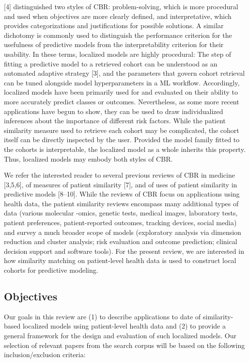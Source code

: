 \documentclass[preprint, 3p,
authoryear]{elsarticle} %
\begin{document}
{[}4{]} distinguished two styles of CBR: problem-solving, which is more
procedural and used when objectives are more clearly defined, and
interpretative, which provides categorizations and justifications for
possible solutions. A similar dichotomy is commonly used to distinguish
the performance criterion for the usefulness of predictive models from
the interpretability criterion for their usability. In these terms,
localized models are highly procedural: The step of fitting a predictive
model to a retrieved cohort can be understood as an automated adaptive
strategy {[}3{]}, and the parameters that govern cohort retrieval can be
tuned alongside model hyperparameters in a ML workflow. Accordingly,
localized models have been primarily used for and evaluated on their
ability to more accurately predict classes or outcomes. Nevertheless, as
some more recent applications have begun to show, they can be used to
draw individualized inferences about the importance of different risk
factors. While the patient similarity measure used to retrieve each
cohort may be complicated, the cohort itself can be directly inspected
by the user. Provided the model family fitted to the cohorts is
interpretable, the localized model as a whole inherits this property.
Thus, localized models may embody both styles of CBR.

We refer the interested reader to several previous reviews of CBR in
medicine {[}3,5,6{]}, of measures of patient similarity {[}7{]}, and of
uses of patient similarity in predictive models {[}8--10{]}. While the
reviews of CBR focus on applications using health data, the patient
similarity reviews encompass many additional types of data (various
molecular -omics, genetic tests, medical images, laboratory tests,
patient preferences, patient-reported outcomes, tracking devices, social
media) and survey a much broader scope of models (exploratory analysis
via dimension reduction and cluster analysis; risk evaluation and
outcome prediction; clinical decision support and software tools). For
the present review, we are interested in how similarity matching on
patient-level health data is used to construct local cohorts for
predictive modeling.

\hypertarget{objectives}{%
\subsection{Objectives}\label{objectives}}

Our goals in this review are (1) to describe applications to date of
similarity-based localized models using patient-level health data and
(2) to provide a general framework for the design and evaluation of such
localized models. Our selection of relevant papers from the search
corpus will be based on the following inclusion/exclusion criteria:
\end{document}
